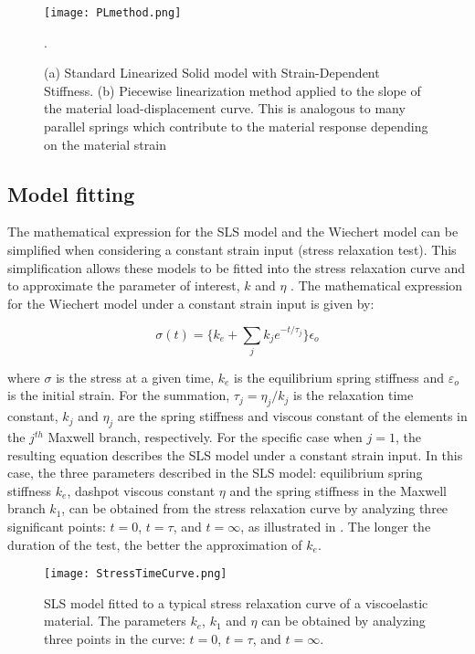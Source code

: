 \begin{figure}[htb!]
	\centering
    \texttt{[image: PLmethod.png]}
    \caption{(a) Standard Linearized Solid model with Strain-Dependent Stiffness. (b) Piecewise linearization method applied to the slope of the material load-displacement curve. This is analogous to many parallel springs which contribute to the material response depending on the material strain \cite{austin2015control}}.
    \label{fig:PLmethod}
\end{figure}

\subsection{Model fitting} \label{sec:Modelfit}

The mathematical expression for the SLS model and the Wiechert model can be simplified when considering a constant strain input (stress relaxation test). This simplification allows these models to be fitted into the stress relaxation curve and to approximate the parameter of interest, $k$ and $\eta$ \cite{roylance2001engineering}. The mathematical expression for the Wiechert model under a constant strain input is given by:

\begin{equation}
\label{eq1}
\sigma(t)=\Bigg\{k_e +  \sum_{j} k_j e^{-t/\tau_j}\Bigg\}\epsilon_o
\end{equation}

\noindent where $\sigma$ is the stress at a given time, $k_e$ is the equilibrium spring stiffness and $\varepsilon_o$ is the initial strain. For the summation, $\tau_j=\eta_j/k_j$ is the relaxation time constant, $k_j$ and $\eta_j$ are the spring stiffness and viscous constant of the elements in the $j^{th}$ Maxwell branch, respectively. For the specific case when $j = 1$, the resulting equation describes the SLS model under a constant strain input. In this case, the three parameters described in the SLS model: equilibrium spring stiffness $k_e$, dashpot viscous constant $\eta$ and the spring stiffness in the Maxwell branch $k_1$, can be obtained from the stress relaxation curve by analyzing three significant points: $t=0$, $t=\tau$, and $t=\infty$, as illustrated in . The longer the duration of the test, the better the approximation of $k_e$.

\begin{figure}[htb!]
	\centering
    \texttt{[image: StressTimeCurve.png]}
    \caption{SLS model fitted to a typical stress relaxation curve of a viscoelastic material. The parameters $k_e$, $k_1$ and $\eta$ can be obtained by analyzing three points in the curve: $t=0$, $t=\tau$, and $t=\infty$.}
    \label{fig:stressTimeCurve}
\end{figure}

